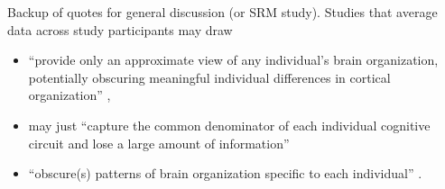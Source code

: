 Backup of quotes for general discussion (or SRM study).  Studies that average
data across study participants may draw

\begin{itemize}

\item ``provide only an approximate view of any individual's brain organization,
    potentially obscuring meaningful individual differences in cortical
        organization'' \citep{laumann2015functional},

\item may just ``capture the common denominator of each individual cognitive
    circuit and lose a large amount of information''

\item ``obscure(s) patterns of brain organization specific to each individual''
    \citep{laumann2015functional}.

\end{itemize}
